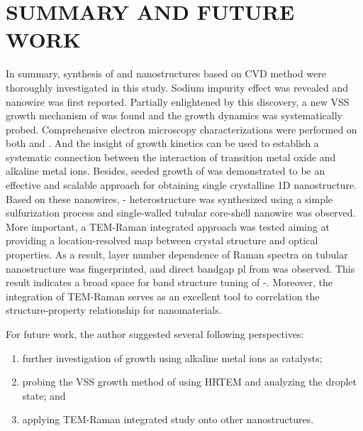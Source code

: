 \chapter{SUMMARY AND FUTURE WORK}

In summary, synthesis of  and  nanostructures based on CVD method were thoroughly investigated in this study. Sodium impurity effect was revealed and  nanowire was first reported. Partially enlightened by this discovery, a new VSS growth mechanism of  was found and the growth dynamics was systematically probed. Comprehensive electron microscopy characterizations were performed on both  and . And the insight of growth kinetics can be used to establish a systematic connection between the interaction of transition metal oxide and alkaline metal ions. Besides, seeded growth of  was demonstrated to be an effective and scalable approach for obtaining single crystalline 1D  nanostructure. Based on these  nanowires, - heterostructure was synthesized using a simple sulfurization process and single-walled  tubular core-shell nanowire was observed. More important, a TEM-Raman integrated approach was tested aiming at providing a location-resolved map between crystal structure and optical properties. As a result, layer number dependence of Raman spectra on  tubular nanostructure was fingerprinted, and direct bandgap \gls{pl} from  was observed. This result indicates a broad space for band structure tuning of -. Moreover, the integration of TEM-Raman serves as an excellent tool to correlation the structure-property relationship for nanomaterials.

For future work, the author suggested several following perspectives:
\begin{enumerate}
\item further investigation of  growth using alkaline metal ions as catalysts;
\item probing the VSS growth method of  using HRTEM and analyzing the droplet state; and
\item applying TEM-Raman integrated study onto other nanostructures.
\end{enumerate}
